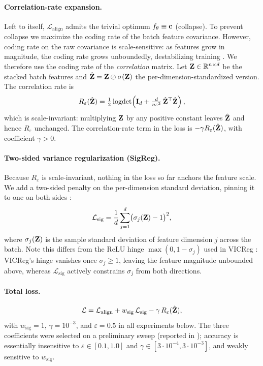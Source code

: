 \paragraph{Correlation-rate expansion.} Left to itself, $\mathcal{L}_\text{align}$ admits the trivial optimum $f_\theta \equiv \mathbf{c}$ (collapse). To prevent collapse we maximize the coding rate \citep{ma2007segmentation, yu2020mcr2} of the batch feature covariance. However, coding rate on the raw covariance is scale-sensitive: as features grow in magnitude, the coding rate grows unboundedly, destabilizing training \citep{kacker2025correlation_rate}. We therefore use the coding rate of the \emph{correlation} matrix. Let $\mathbf{Z} \in \mathbb{R}^{n \times d}$ be the stacked batch features and $\hat{\mathbf{Z}} = \mathbf{Z} \oslash \sigma(\mathbf{Z})$ the per-dimension-standardized version. The correlation rate is
\begin{equation}
\label{eq:corr_rate}
    R_\varepsilon(\hat{\mathbf{Z}}) = \tfrac{1}{2}\operatorname{logdet}\!\left(\mathbf{I}_d + \tfrac{d}{n \varepsilon^2}\, \hat{\mathbf{Z}}^\top \hat{\mathbf{Z}}\right),
\end{equation}
which is scale-invariant: multiplying $\mathbf{Z}$ by any positive constant leaves $\hat{\mathbf{Z}}$ and hence $R_\varepsilon$ unchanged. The correlation-rate term in the loss is $-\gamma R_\varepsilon(\hat{\mathbf{Z}})$, with coefficient $\gamma > 0$.

\paragraph{Two-sided variance regularization (SigReg).} Because $R_\varepsilon$ is scale-invariant, nothing in the loss so far anchors the feature scale. We add a two-sided penalty on the per-dimension standard deviation, pinning it to one on both sides \citep{schaeffer2024sigreg}:
\begin{equation}
    \mathcal{L}_\text{sig} = \frac{1}{d} \sum_{j=1}^{d} \bigl(\sigma_j(\mathbf{Z}) - 1\bigr)^2,
\end{equation}
where $\sigma_j(\mathbf{Z})$ is the sample standard deviation of feature dimension $j$ across the batch. Note this differs from the ReLU hinge $\max(0, 1 - \sigma_j)$ used in VICReg \citep{bardes2022vicreg}: VICReg's hinge vanishes once $\sigma_j \ge 1$, leaving the feature magnitude unbounded above, whereas $\mathcal{L}_\text{sig}$ actively constrains $\sigma_j$ from both directions.

\paragraph{Total loss.}
\begin{equation}
\label{eq:loss}
    \mathcal{L} = \mathcal{L}_\text{align} + w_\text{sig}\, \mathcal{L}_\text{sig} - \gamma\, R_\varepsilon(\hat{\mathbf{Z}}),
\end{equation}
with $w_\text{sig} = 1$, $\gamma = 10^{-3}$, and $\varepsilon = 0.5$ in all experiments below. The three coefficients were selected on a preliminary sweep (reported in ); accuracy is essentially insensitive to $\varepsilon \in [0.1, 1.0]$ and $\gamma \in [3 \cdot 10^{-4}, 3 \cdot 10^{-3}]$, and weakly sensitive to $w_\text{sig}$.

